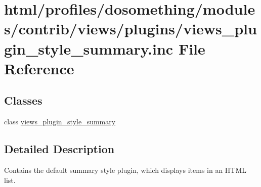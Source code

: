 \hypertarget{views__plugin__style__summary_8inc}{
\section{html/profiles/dosomething/modules/contrib/views/plugins/views\_\-plugin\_\-style\_\-summary.inc File Reference}
\label{views__plugin__style__summary_8inc}
}
\subsection*{Classes}
\begin{DoxyCompactItemize}
\item 
class \hyperlink{classviews__plugin__style__summary}{views\_\-plugin\_\-style\_\-summary}
\end{DoxyCompactItemize}


\subsection{Detailed Description}
Contains the default summary style plugin, which displays items in an HTML list. 